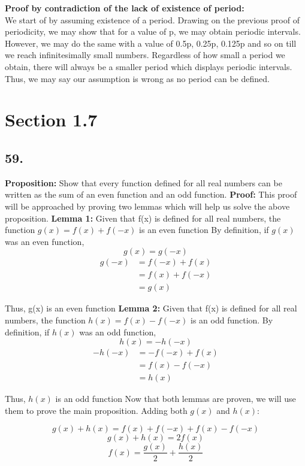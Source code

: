 \documentclass[12pt, a4paper]{article}
\begin{document}
\noindent\textbf{Proof by contradiction of the lack of existence of period:}\\
We start of by assuming existence of a period. Drawing on the previous proof of periodicity, we may show that for a value of p, we may obtain periodic intervals. However, we may do the same with a value of 0.5p, 0.25p, 0.125p and so on till we reach infinitesimally small numbers. Regardless of how small a period we obtain, there will always be a smaller period which displays periodic intervals. Thus, we may say our assumption is wrong as no period can be defined.
\newpage
\section*{Section 1.7}\bigbreak
\subsection*{59.}
\textbf{Proposition:}  Show that every function defined for all real numbers can be written as the sum of an even function and an odd function.
\bigbreak
\noindent\textbf{Proof:}
This proof will be approached by proving two lemmas which will help us solve the above proposition.
\bigbreak
\noindent \textbf{Lemma 1:} Given that f(x) is defined for all real numbers, the function $g(x) = f(x) + f(-x)$ is an even function
\bigbreak
By definition, if $g(x)$ was an even function,
\[
g(x) = g(-x)
\]
\begin{align}
    g(-x) &= f(-x) + f(x)\\
    &= f(x) + f(-x)\\
    &= g(x)
\end{align}

Thus, g(x) is an even function
\bigbreak
\noindent \textbf{Lemma 2:} Given that f(x) is defined for all real numbers, the function $h(x) = f(x) - f(-x)$ is an odd function.
\bigbreak
By definition, if $h(x)$ was an odd function,
\[
h(x) = -h(-x)
\]
\begin{align}
    -h(-x) &= -f(-x) + f(x)\\
    &= f(x) - f(-x)\\
    &= h(x)
\end{align}

Thus, $h(x)$ is an odd function
\bigbreak
Now that both lemmas are proven, we will use them to prove the main proposition. Adding both $g(x)$ and $h(x)$:

\[
g(x) + h(x) = f(x) + f(-x) + f(x) - f(-x)
\]
\[
g(x) + h(x) = 2f(x)
\]
\[
f(x) = \frac{g(x)}{2} + \frac{h(x)}{2}
\]
\end{document}
